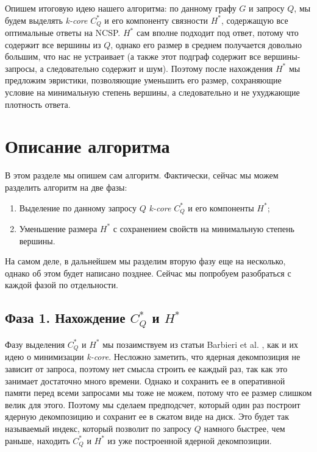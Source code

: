 Опишем итоговую идею нашего алгоритма: по данному графу $G$ и запросу $Q$, мы будем выделять \textit{k-core} $C_Q^*$ и его компоненту связности $H^*$, содержащую все оптимальные ответы на NCSP. $H^*$ сам вполне подходит под ответ, потому что содержит все вершины из $Q$, однако его размер в среднем получается довольно большим, что нас не устраивает (а также этот подграф содержит все вершины-запросы, а следовательно содержит и шум). Поэтому после нахождения $H^*$ мы предложим эвристики, позволяющие уменьшить его размер, сохраняющие условие на минимальную степень вершины, а следовательно и не ухуджающие плотность ответа.

\section{Описание алгоритма}

В этом разделе мы опишем сам алгоритм. Фактически, сейчас мы можем разделить алгоритм на две фазы:

\begin{enumerate}
  \item Выделение по данному запросу $Q$ \textit{k-core} $C_Q^*$ и его компоненты $H^*$;
  \item Уменьшение размера $H^*$ с сохранением свойств на минимальную степень вершины.
\end{enumerate}

На самом деле, в дальнейшем мы разделим вторую фазу еще на несколько, однако об этом будет написано позднее. Сейчас мы попробуем разобраться с каждой фазой по отдельности.

\subsection{Фаза 1. Нахождение $C_Q^*$ и $H^*$}

Фазу выделения $C_Q^*$ и $H^*$ мы позаимствуем из статьи Barbieri et al. \cite{Barbieri15}, как и их идею о минимизации \textit{k-core}. Несложно заметить, что ядерная декомпозиция не зависит от запроса, поэтому нет смысла строить ее каждый раз, так как это занимает достаточно много времени. Однако и сохранить ее в оперативной памяти перед всеми запросами мы тоже не можем, потому что ее размер слишком велик для этого. Поэтому мы сделаем предподсчет, который один раз построит ядерную декомпозицию и сохранит ее в сжатом виде на диск. Это будет так называемый индекс, который позволит по запросу $Q$ намного быстрее, чем раньше, находить $C_Q^*$ и $H^*$ из уже построенной ядерной декомпозиции.

